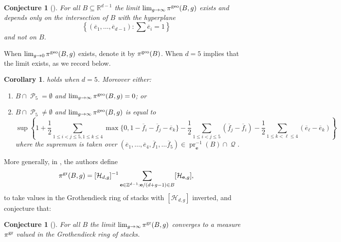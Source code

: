 \documentclass[11pt]{amsart}
\numberwithin{theorem}{section}
\numberwithin{equation}{section}
\newtheorem{coro}[theorem]{Corollary}
\newtheorem{conjecture}[theorem]{Conjecture}
\theoremstyle{definition}\newtheorem{defn}[theorem]{Definition}
\theoremstyle{definition}\newtheorem{remark}[theorem]{Remark}
\theoremstyle{definition}\newtheorem{question}[theorem]{Question}
\theoremstyle{definition}\newtheorem{problem}[theorem]{Problem}
\newcommand{\RR}{\mathbb{R}}
\newcommand{\ZZ}{\mathbb{Z}}
\DeclareMathOperator{\polytope}{\mathcal{P}}
\DeclareMathOperator{\qpolytope}{\mathcal{Q}}
\DeclareMathOperator{\pr}{pr}
\renewcommand{\subset}{\subseteq}
\begin{document}
\begin{conjecture}[{\cite[Conjecture~8.4]{VV}}]
\label{conj:limiting}
For all $B \subset \RR^{d-1}$ the limit $\lim_{g \rightarrow \infty} \pi^{\textnormal{geo}}(B,g)$ exists and depends only on the intersection of $B$ with the hyperplane 
\[
\left\{ (\overline{e}_1, \dots, \overline{e}_{d-1}) : \sum \overline{e}_i = 1 \right\}
\]
and not on $B$. 
\end{conjecture}

When $\lim_{g \rightarrow 0}\pi^{\textnormal{geo}}(B,g)$ exists, denote it by $\pi^{\textnormal{geo}}(B)$. When $d = 5$  implies that the limit exists, as we record below.

\begin{coro}
    \label{coro:groth-ring}
     holds when $d = 5$. Moreover either:
    \begin{enumerate}[label=(\roman*)]
        \item $B \cap \polytope_5 = \emptyset$ and $\lim_{g \rightarrow \infty} \pi^{\textnormal{geo}}(B,g) = 0$; or
    \item
    $B \cap \polytope_5 \neq \emptyset$ and $\lim_{g \rightarrow \infty} \pi^{\textnormal{geo}}(B,g)$ is equal to
    \begin{equation*}
    \label{eqn:pi}
    \sup \left\{ 1 + \frac{1}{2}\sum_{1 \leq i < j \leq 5, 1 \leq k \leq 4} \max\{0,1-\overline{f}_i - \overline{f}_j - \overline{e}_k\} - \frac{1}{2}\sum_{1 \leq i < j \leq 5}(\overline{f}_j - \overline{f}_i) - \frac{1}{2}\sum_{1 \leq k < \ell \leq 4}(\overline{e}_{\ell} - \overline{e}_k) \right \}
    \end{equation*}
    where the supremum is taken over $(\overline{e}_1,\dots,\overline{e}_4, \overline{f}_1, \dots\overline{f}_5) \in \pr_{\mathbf{e}}^{-1}(B) \cap \qpolytope$.
    \end{enumerate}
\end{coro}
 
More generally, in \cite[Section~8]{VV}, the authors define
$$\pi^{\textnormal{gr}}(B,g) = [\mathcal{H}_{d,g}]^{-1}\sum_{{\mathbf{e}} \in \ZZ^{d-1} : {\mathbf{e}}/(d+g-1) \in B}    [\mathcal{H}_{{\mathbf{e}},g}],$$
to take values in the Grothendieck ring of stacks with  $[\mathcal{H}_{d,g}]$ inverted, and conjecture that:

\begin{conjecture}[{\cite[Conjecture~8.6]{VV}}]
\label{conj:groth}
For all $B$ the limit $\lim_{g \rightarrow \infty} \pi^{\textnormal{gr}}(B,g)$ converges to a measure $\pi^{\textnormal{gr}}$ valued in the Grothendieck ring of stacks.  
\end{conjecture}
\end{document}
